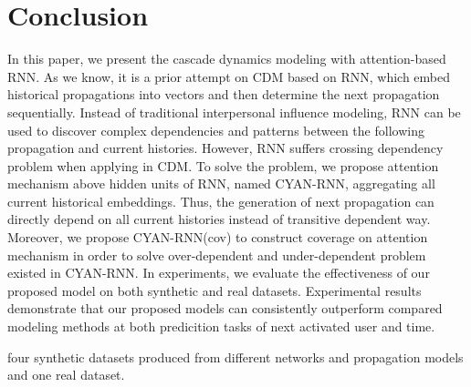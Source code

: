 \section{Conclusion}

In this paper, we present the cascade dynamics modeling with attention-based
RNN. As we know, it is a prior attempt on CDM based on RNN, which embed
historical propagations into vectors and then determine the next propagation sequentially. 
Instead of traditional interpersonal influence modeling, RNN can
be used to discover complex dependencies and patterns between the following
propagation and current histories. 
However, RNN suffers crossing dependency problem when applying
in CDM. To solve the problem, we propose attention mechanism
above hidden units of RNN, named CYAN-RNN, aggregating all current historical
embeddings. Thus, the generation of next propagation can directly depend on all
current histories instead of transitive dependent way. Moreover, we propose
CYAN-RNN(cov) to construct coverage on attention mechanism in order to solve
over-dependent and under-dependent problem existed in CYAN-RNN. In experiments,
we evaluate the effectiveness of our proposed model on both synthetic and real
datasets. Experimental results demonstrate that our proposed models can
consistently outperform compared modeling methods at both predicition tasks of
next activated user and time. 

four synthetic datasets
produced from different networks and propagation models and one real dataset. 


% 
